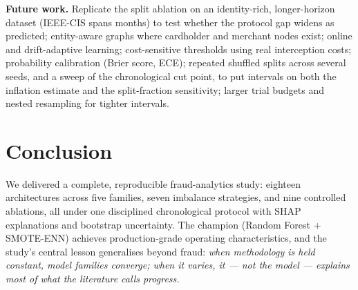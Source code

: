 \documentclass[11pt,a4paper]{article}
\begin{document}
\textbf{Future work.} Replicate the split ablation on an identity-rich, longer-horizon dataset
(IEEE-CIS spans months) to test whether the protocol gap widens as predicted; entity-aware graphs
where cardholder and merchant nodes exist; online and drift-adaptive learning; cost-sensitive
thresholds using real interception costs; probability calibration (Brier score, ECE); repeated
shuffled splits across several seeds, and a sweep of the chronological cut point, to put
intervals on both the inflation estimate and the split-fraction sensitivity; larger
trial budgets and nested resampling for tighter intervals.

\section{Conclusion}

We delivered a complete, reproducible fraud-analytics study: eighteen architectures across five
families, seven imbalance strategies, and nine controlled ablations, all under one disciplined
chronological protocol with SHAP explanations and bootstrap uncertainty. The champion
(Random Forest + SMOTE-ENN) achieves production-grade operating characteristics, and the study's
central lesson generalises beyond fraud: \emph{when methodology is held constant, model families
converge; when it varies, it --- not the model --- explains most of what the literature calls
progress.}
\end{document}
